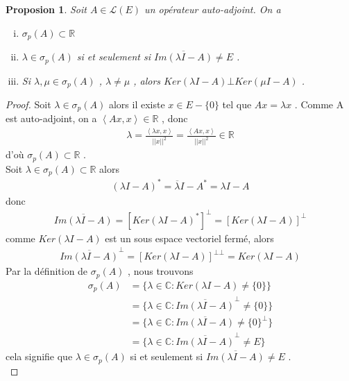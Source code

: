 \documentclass{report}
\newtheorem{Prop}{Proposion}[subsection]
\begin{document}
{\begin{Prop} Soit $A \in \mathscr{L}(E)$ un opérateur auto-adjoint. On a 
	\begin{enumerate}[i)]
	\item   $\sigma_p(A) \subset \mathbb{R}$ 
	\item  $\lambda \in \sigma_p(A)$ si et seulement si $\overline{Im(\lambda I - A)} \neq E$ . 
	


	\item Si $\lambda, \mu \in \sigma_p(A)$ , $\lambda \neq \mu$ , alors $Ker(\lambda I - A) \bot Ker(\mu I - A)$ .\\
\end{enumerate}
\end{Prop}
\begin{proof}
   Soit $\lambda \in \sigma_p(A)$ alors il existe $x \in E - \{0\}$ tel que $A x = \lambda x$ . Comme A est auto-adjoint, on a $\left< Ax,x \right> \in \mathbb{R}$ , donc 
					\begin{align*}
					 \lambda = \frac{\left< \lambda x, x \right>}{||x||^2} = \frac{\left< Ax,x \right>}{||x||^2} \in \mathbb{R} 
					\end{align*}
	d'où $\sigma_p(A) \subset \mathbb{R}$ . \\

  Soit $\lambda \in \sigma_p(A) \subset \mathbb{R}$ alors 
					\begin{align*}
					 (\lambda I - A)^* = \overline{\lambda} I - A^* = \lambda I - A 
					\end{align*}
	donc 
					\begin{align*}
					 \overline{Im(\lambda I - A)} = [Ker(\lambda I - A)^*]^{\bot} = [Ker(\lambda I - A)]^{\bot} 
					\end{align*}
	comme $Ker(\lambda I - A)$ est un sous espace vectoriel fermé, alors 
					\begin{align*}
					 \overline{Im(\lambda I - A)}^{\bot} = [Ker(\lambda I - A)]^{\bot \bot} = Ker(\lambda I - A) 
					\end{align*}
	Par la définition de $\sigma_p(A)$ , nous trouvons 
					\begin{align*}
					 \sigma_p(A) &= \{\lambda \in \mathbb{C} : Ker(\lambda I - A) \neq \{0\}\} \\
					 &= \{\lambda \in \mathbb{C} : \overline{Im(\lambda I - A)}^{\bot} \neq \{0\}\} \\
					 &= \{\lambda \in \mathbb{C} : \overline{Im(\lambda I - A)} \neq \{0\}^{\bot} \} \\
					 &= \{\lambda \in \mathbb{C} : \overline{Im(\lambda I - A)}^{\bot} \neq E\} 
					\end{align*}
	cela signifie que $\lambda \in \sigma_p(A)$ si et seulement si $\overline{Im(\lambda I - A)} \neq E$ .\\


\end{proof}}
\end{document}
